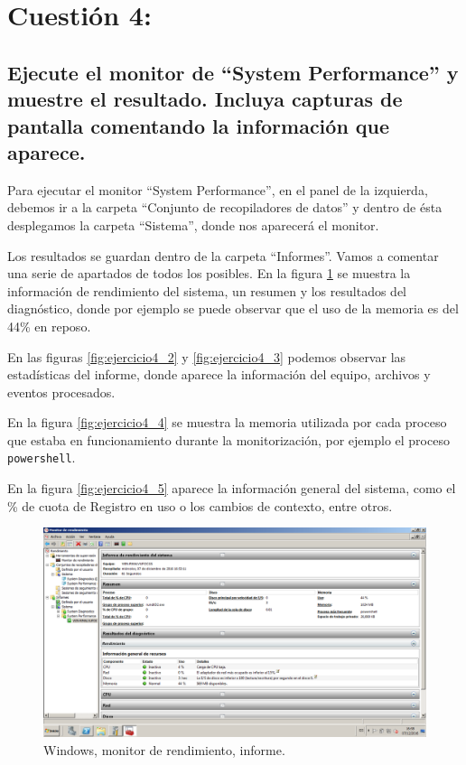 
\section{Cuestión 4:}

\subsection{Ejecute el monitor de ``System Performance'' y muestre el resultado. Incluya capturas de pantalla comentando la información que  aparece.}

Para ejecutar el monitor ``System Performance'', en el panel de la izquierda, debemos ir a la carpeta ``Conjunto de recopiladores de datos'' y dentro de ésta desplegamos la carpeta ``Sistema'', donde nos aparecerá el monitor.

Los resultados se guardan dentro de la carpeta ``Informes''. Vamos a comentar una serie de apartados de todos los posibles. En la figura \ref{fig:ejercicio4_1} se muestra la información de rendimiento del sistema, un resumen y los resultados del diagnóstico, donde por ejemplo se puede observar que el uso de la memoria es del 44\% en reposo.

En las figuras \ref{fig:ejercicio4_2} y \ref{fig:ejercicio4_3} podemos observar las estadísticas del informe, donde aparece la información del equipo, archivos y eventos procesados.

En la figura \ref{fig:ejercicio4_4} se muestra la memoria utilizada por cada proceso que estaba en funcionamiento durante la monitorización, por ejemplo el proceso \texttt{powershell}.

En la figura \ref{fig:ejercicio4_5} aparece la información general del sistema, como el \% de cuota de Registro en uso o los cambios de contexto, entre otros.

\begin{figure}[H] 
	\centering
	\includegraphics[width=14.7cm]{./img/ejercicio4_1.png} 	
	\caption{Windows, monitor de rendimiento, informe.} \label{fig:ejercicio4_1}
\end{figure}

